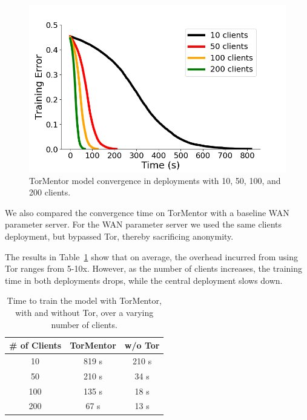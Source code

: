 \begin{figure}[t]
	\includegraphics[width=\linewidth]{fig/withtor}
	\caption{TorMentor model convergence in deployments with 10, 50,
          100, and 200 clients.
        }
	\label{fig:withtor}
\end{figure}


We also compared the convergence time on TorMentor with a baseline
\ac{WAN} parameter server. For the WAN parameter server we used the same
clients deployment, but bypassed Tor, thereby sacrificing anonymity.

The results in Table~\ref{tab:latency} show that on average, the
overhead incurred from using Tor ranges from 5-10x. However, as the
number of clients increases, the training time in both deployments
drops, while the central deployment slows down.

\begin{table}[t]
\centering
\begin{tabular}{ c|cc }
 \hline
 \textbf{\# of Clients} & 
 \textbf{TorMentor}    & 
 \textbf{w/o Tor}  \\
 \hline
 10                    & 819 s & 210 s \\
 \hline
 50                    & 210 s  & 34 s \\
 \hline
 100                   & 135 s  & 18 s \\
 \hline
 200                   & 67 s   & 13 s \\
\end{tabular} 
\caption{Time to train the model with TorMentor, with and without Tor,
over a varying number of clients.
  \label{tab:latency}}
\end{table}

